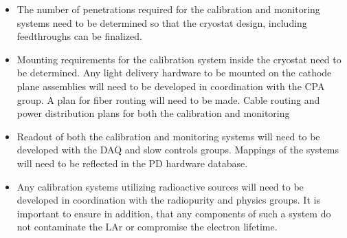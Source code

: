 \begin{itemize}
\item The number of penetrations required for the calibration and monitoring systems need to be determined so that the cryostat design, including feedthroughs can be finalized.
\item Mounting requirements for the calibration system inside the cryostat need to be determined. Any light delivery hardware to be mounted on the cathode plane assemblies will need to be developed in coordination with the CPA group. A plan for fiber routing will need to be made. Cable routing and power distribution plans for both the calibration and monitoring
\item Readout of both the calibration and monitoring systems will need to be developed with the DAQ and slow controls groups. Mappings of the systems will need to be reflected in the PD hardware database.
\item Any calibration systems utilizing radioactive sources will need to be developed in coordination with the radiopurity and physics groups. It is important to ensure in addition, that any components of such a system do not contaminate the LAr or compromise the electron lifetime.
\end{itemize}
 






